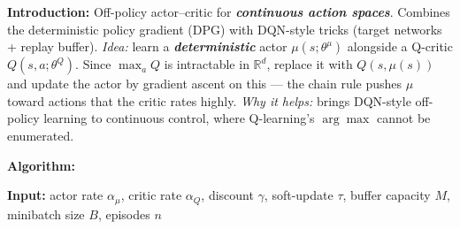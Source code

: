 \documentclass[11pt]{article}
\begin{document}
    \label{intro-4-5}

    \textbf{Introduction:} Off-policy actor--critic for
\textbf{\emph{continuous action spaces}}. Combines the deterministic
policy gradient (DPG) with DQN-style tricks (target networks + replay
buffer). \emph{Idea:} learn a \textbf{\emph{deterministic}} actor
\(\mu(s;\theta^\mu)\) alongside a Q-critic \(Q(s,a;\theta^Q)\). Since
\(\max_a Q\) is intractable in \(\mathbb{R}^d\), replace it with
\(Q(s, \mu(s))\) and update the actor by gradient ascent on this --- the
chain rule pushes \(\mu\) toward actions that the critic rates highly.
\emph{Why it helps:} brings DQN-style off-policy learning to continuous
control, where Q-learning's \(\arg\max\) cannot be enumerated.

    \textbf{Algorithm:}

\textbf{Input:} actor rate \(\alpha_\mu\), critic rate \(\alpha_Q\),
discount \(\gamma\), soft-update \(\tau\), buffer capacity \(M\),
minibatch size \(B\), episodes \(n\)
\end{document}
